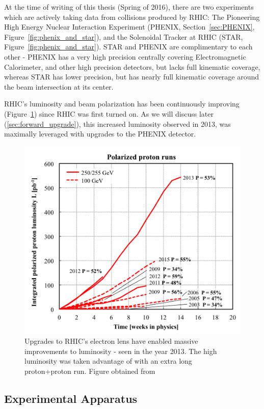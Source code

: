 At the time of writing of this thesis (Spring of 2016), there are two
experiments which are actively taking data from collisions produced by RHIC: The
Pioneering High Energy Nuclear Interaction Experiment (PHENIX,
Section~\ref{sec:PHENIX}, Figure~\ref{fig:phenix_and_star}), and the Solenoidal
Tracker at RHIC (STAR, Figure~\ref{fig:phenix_and_star}). STAR and PHENIX are
complimentary to each other - PHENIX has a very high precision centrally
covering Electromagnetic Calorimeter, and other high precision detectors, but
lacks full kinematic coverage, whereas STAR has lower precision, but has nearly
full kinematic coverage around the beam intersection at its center.

RHIC's luminosity and beam polarization has been continuously improving
(Figure~\ref{fig:rhic_luminosity}) since RHIC was first turned on. As we will
discuss later (\ref{sec:forward_upgrade}), this increased luminosity observed in
2013, was maximally leveraged with upgrades to the PHENIX detector.

\begin{figure}[ht]
  \centering
  \includegraphics[width=0.8\linewidth]{./figures/RhicLuminosityPP.png}
  \caption{
    Upgrades to RHIC's electron lens have enabled massive improvements to
    luminosity - seen in the year 2013. The high luminosity was taken advantage
    of with an extra long proton+proton run. Figure obtained from
     \cite{Fischer2016}
  }
  \label{fig:rhic_luminosity}
\end{figure}


\clearpage

\subsection{Experimental Apparatus}

